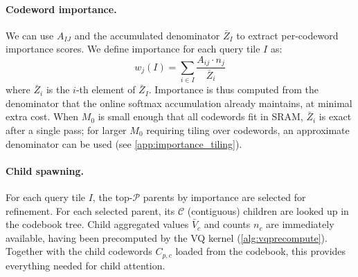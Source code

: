 \paragraph{Codeword importance.}
\label{sec:importance}
We can use $A_{IJ}$ and the accumulated denominator $\bar{Z}_I$ to extract per-codeword importance scores. We define importance for each query tile $I$ as:
\begin{equation}
\label{eq:importance}
w_j(I) = \sum_{i \in I} \frac{A_{ij} \cdot n_j}{\bar{Z}_i}
\end{equation}
where $\bar{Z}_i$ is the $i$-th element of $\bar{Z}_I$. Importance is thus computed from the denominator that the online softmax accumulation already maintains, at minimal extra cost. When $M_0$ is small enough that all codewords fit in SRAM, $\bar{Z}_i$ is exact after a single pass; for larger $M_0$ requiring tiling over codewords, an approximate denominator can be used (see \cref{app:importance_tiling}).

\paragraph{Child spawning.}
For each query tile $I$, the top-$\mathcal{P}$ parents by importance are selected for refinement. For each selected parent, its $\mathcal{C}$ (contiguous) children are looked up in the codebook tree. Child aggregated values $\bar{V}_c$ and counts $n_c$ are immediately available, having been precomputed by the VQ kernel (\cref{alg:vqprecompute}). Together with the child codewords $C_{p,c}$ loaded from the codebook, this provides everything needed for child attention.

